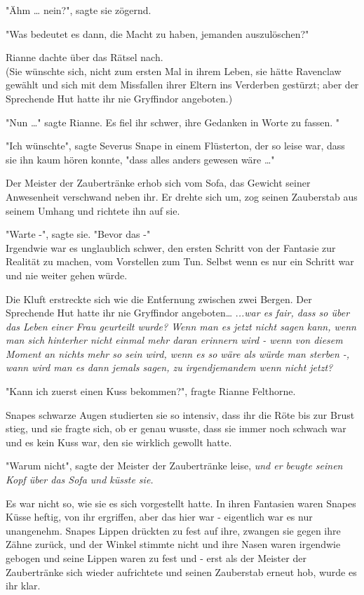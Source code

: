 {"Ähm … nein?", sagte sie zögernd.

"Was bedeutet es dann, die Macht zu haben, jemanden auszulöschen?"

Rianne dachte über das Rätsel nach.\\ (Sie wünschte sich, nicht zum ersten Mal in ihrem Leben, sie hätte Ravenclaw gewählt und sich mit dem Missfallen ihrer Eltern ins Verderben gestürzt; aber der Sprechende Hut hatte ihr nie Gryffindor angeboten.)

"Nun …" sagte Rianne. Es fiel ihr schwer, ihre Gedanken in Worte zu fassen. "

"Ich wünschte", sagte Severus Snape in einem Flüsterton, der so leise war, dass sie ihn kaum hören konnte, "dass alles anders gewesen wäre …"

Der Meister der Zaubertränke erhob sich vom Sofa, das Gewicht seiner Anwesenheit verschwand neben ihr. Er drehte sich um, zog seinen Zauberstab aus seinem Umhang und richtete ihn auf sie.

"Warte -", sagte sie. "Bevor das -"\\ Irgendwie war es unglaublich schwer, den ersten Schritt von der Fantasie zur Realität zu machen, vom Vorstellen zum Tun. Selbst wenn es nur ein Schritt war und nie weiter gehen würde.

Die Kluft erstreckte sich wie die Entfernung zwischen zwei Bergen. Der Sprechende Hut hatte ihr nie Gryffindor angeboten… .\emph{..war es fair, dass so über das Leben einer Frau geurteilt wurde? Wenn man es jetzt nicht sagen kann, wenn man sich hinterher nicht einmal mehr daran erinnern wird - wenn von diesem Moment an nichts mehr so sein wird, wenn es so wäre als würde man sterben -, wann wird man es dann jemals sagen, zu irgendjemandem wenn nicht jetzt?}

"Kann ich zuerst einen Kuss bekommen?", fragte Rianne Felthorne.

Snapes schwarze Augen studierten sie so intensiv, dass ihr die Röte bis zur Brust stieg, und sie fragte sich, ob er genau wusste, dass sie immer noch schwach war und es kein Kuss war, den sie wirklich gewollt hatte.

"Warum nicht", sagte der Meister der Zaubertränke leise, \emph{und er beugte seinen Kopf über das Sofa und küsste sie.}

Es war nicht so, wie sie es sich vorgestellt hatte. In ihren Fantasien waren Snapes Küsse heftig, von ihr ergriffen, aber das hier war - eigentlich war es nur unangenehm. Snapes Lippen drückten zu fest auf ihre, zwangen sie gegen ihre Zähne zurück, und der Winkel stimmte nicht und ihre Nasen waren irgendwie gebogen und seine Lippen waren zu fest und - erst als der Meister der Zaubertränke sich wieder aufrichtete und seinen Zauberstab erneut hob, wurde es ihr klar.

}
